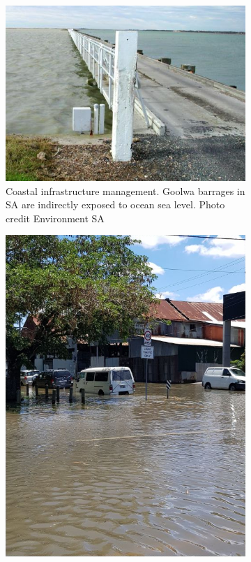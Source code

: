 \begin{figure}[!hbt]\centering
  \begin{subfigure}[t]{\figwidthHalf}
      \includegraphics[width=\textwidth]{figures/images/goolwa_ewe_island-environment_sa_gov_au.jpg}
      \caption{Coastal infrastructure management. Goolwa barrages in SA are indirectly exposed to ocean sea level. Photo credit Environment SA }
  \end{subfigure}
  \hfill
  \begin{subfigure}[t]{\figwidthHalf}
      \includegraphics[trim={0 9cm 0 2cm},clip,width=\textwidth]{figures/images/sunnyFlood_ClarkJan2018Brisbane.png}

\end{subfigure}
\end{figure}
